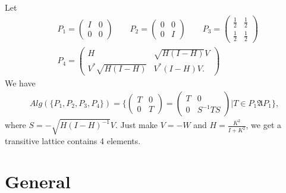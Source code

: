 \documentclass[a4paper,10pt]{amsart}
\newcommand{\AAA}{\mathfrak A}
\begin{document}
Let 
\begin{align*}
&P_1 = \begin{pmatrix}
I & 0\\
0 & 0 
\end{pmatrix} \qquad
P_2 = \begin{pmatrix}
0 & 0\\
0 & I 
\end{pmatrix}\qquad 
P_3 = \begin{pmatrix}
\frac{1}{2} & \frac{1}{2}\\
\frac{1}{2} & \frac{1}{2}
\end{pmatrix}\\
&P_4 = \begin{pmatrix}
H & \sqrt{H(I-H)}V\\
V^{*}\sqrt{H(I-H)} & V^{*}(I - H)V.
\end{pmatrix}
\end{align*}
We have 
\begin{align*}
Alg(\{ P_1, P_2, P_3, P_4 \}) = \{ 
\begin{pmatrix}
T & 0\\
0 & T
\end{pmatrix}
= 
\begin{pmatrix}
T & 0\\
0 & S^{-1}TS
\end{pmatrix} | T \in P_1\AAA P_1\},
\end{align*}
where $S = -\sqrt{H(I - H)^{-1}}V$.
Just make $V = -W$ and $H = \frac{K^{2}}{I + K^{2}}$, we get a 
transitive lattice contains 4 elements.

\section{General}
\end{document}
